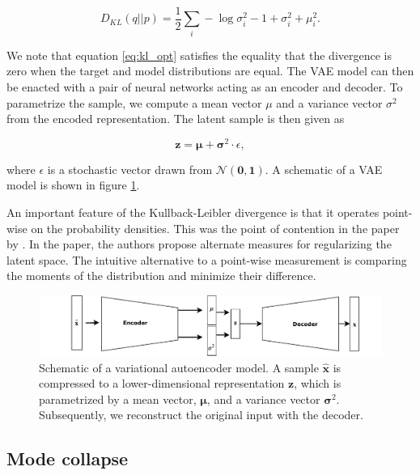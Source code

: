 \begin{equation}\label{eq:kl_opt}
D_{KL}(q||p) = \frac{1}{2} \sum_i -\log \sigma_i^2 - 1 + \sigma^2_i + \mu_i^2 .
\end{equation}

\noindent We note that equation \ref{eq:kl_opt} satisfies the equality that the divergence is zero when the target and model distributions are equal. The VAE model can then be enacted with a pair of neural networks acting as an encoder and decoder. To parametrize the sample, we compute a mean vector $\mu$ and a variance vector $\sigma^2$ from the encoded representation. The latent sample is then given as 

\begin{equation}
\boldsymbol{z} = \boldsymbol{\mu} + \boldsymbol{\sigma}^2 \cdot \epsilon,
\end{equation} 

\noindent where $\epsilon$ is a stochastic vector drawn from $\mathcal{N}(\boldsymbol{0}, \boldsymbol{1})$. A schematic of a VAE model is shown in figure \ref{fig:var_autoencoder}.

An important feature of the Kullback-Leibler divergence is that it operates point-wise on the probability densities. This was the point of contention in the paper by \citet{Zhao}. In the paper, the authors propose alternate measures for regularizing the latent space. The intuitive alternative to a point-wise measurement is comparing the moments of the distribution and minimize their difference. 


\begin{figure}[tb]
	\centering
	\includegraphics[width=\textwidth]{plots/variational_autoenc.pdf}
	\caption[Variational autoencoder schematic]{Schematic of a variational autoencoder model. A sample $\hat{\boldsymbol{x}}$ is compressed to a lower-dimensional representation $\boldsymbol{z}$, which is parametrized by a mean vector, $\boldsymbol{\mu}$, and a variance vector $\boldsymbol{\sigma}^2$. Subsequently, we reconstruct the original input with the decoder.}
	\label{fig:var_autoencoder}
\end{figure}


\subsection{Mode collapse}\label{sec:mode_collapse}

